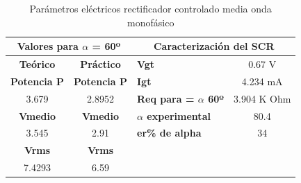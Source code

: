 \begin{table}[h]
	\centering
	\begin{tabular}{|cc|lc|}
		\hline
		\multicolumn{2}{|c|}{\textbf{Valores para $\alpha$ = 60º}}               & \multicolumn{2}{c|}{\textbf{Caracterización del SCR}}                                                                                                                                          \\ \hline
		\multicolumn{1}{|c|}{\textbf{Teórico}}    & \textbf{Práctico}   & \multicolumn{1}{l|}{\textbf{Vgt}}                                                                                & 0.67 V                                                                      \\ \hline
		\multicolumn{1}{|c|}{\textbf{Potencia P}} & \textbf{Potencia P} & \multicolumn{1}{l|}{\textbf{Igt}}                                                                                & 4.234 mA                                                                    \\ \hline
		\multicolumn{1}{|c|}{3.679}               & 2.8952              & \multicolumn{1}{l|}{\textbf{Req para = $\alpha$ 60º}}                                                                     & 3.904 K Ohm                                                                 \\ \hline
		\multicolumn{1}{|c|}{\textbf{Vmedio}}     & \textbf{Vmedio}     & \multicolumn{1}{l|}{\textbf{$\alpha$ experimental}}                                                                 & 80.4                                                                        \\ \hline
		\multicolumn{1}{|c|}{3.545}               & 2.91               & \multicolumn{1}{l|}{\textbf{er\% de alpha}}                                                                      & 34                                                                          \\ \hline
		\multicolumn{1}{|c|}{\textbf{Vrms}}       & \textbf{Vrms}       & \multicolumn{2}{l|}{\multirow{2}{*}{}} \\ \cline{1-2}
		\multicolumn{1}{|c|}{7.4293}              & 6.59                & \multicolumn{2}{l|}{}                                                                                                                                                                          \\ \hline
	\end{tabular}
	\caption{Parámetros eléctricos rectificador controlado media onda monofásico}
	\label{tab:parametros-rect-controlado}
\end{table}

